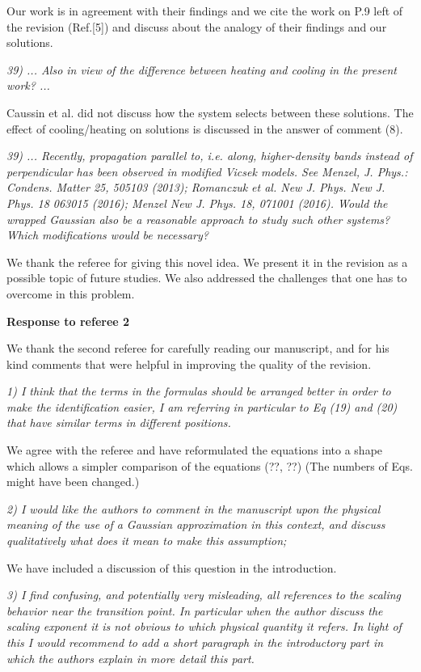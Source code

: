 \documentclass[a4paper,11pt]{letter}
\newcommand{\rf}[1]{\textit{\textcolor{hlcolor}{#1}}}
\begin{document}
Our work is in agreement with their findings and we cite the work on P.9 left of the revision (Ref.[5]) and discuss about the analogy of their findings and our solutions.

\rf{39) ... Also in view of the difference between heating and cooling in the present work? ...}

Caussin et al. did not discuss how the system selects between these solutions. The effect of cooling/heating on solutions is discussed in the answer of comment (8).

\rf{39) ... Recently, propagation parallel to, i.e. along, higher-density bands instead of perpendicular has been observed in modified Vicsek models. See Menzel, J. Phys.: Condens. Matter 25, 505103 (2013); Romanczuk et al. New J. Phys. New J. Phys. 18 063015 (2016); Menzel New J. Phys. 18, 071001 (2016). Would the wrapped Gaussian also be a reasonable approach to study such other systems? Which modifications would be necessary?}

We thank the referee for giving this novel idea. We present it in the revision as a possible topic of future studies. We also addressed the challenges that one has to overcome in this problem.




\pagebreak

{\Large \bf Response to referee 2}

We thank the second referee for carefully reading our manuscript, and for his kind comments that were helpful in improving the quality of the revision.

\rf{1) I think that the terms in the formulas should be arranged better in order to make the identification easier, I am referring in particular to Eq (19) and (20) that have similar terms in different positions.}

We agree with the referee and have reformulated the equations into a shape which allows a simpler comparison of the equations (??, ??) (The numbers of Eqs. might have been changed.)

\rf{2) I would like the authors to comment in the manuscript upon the physical meaning of the use of a Gaussian approximation in this context, and discuss qualitatively what does it mean to make this assumption;}

We have included a discussion of this question in the introduction.

\rf{3) I find confusing, and potentially very misleading, all references to the scaling behavior near the transition point. In particular when the author discuss the scaling exponent it is not obvious to which physical quantity it refers. In light of this I would recommend to add a short paragraph in the introductory part in which the authors explain in more detail this part.}
\end{document}
